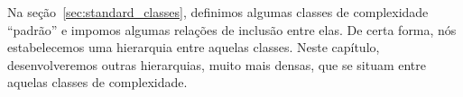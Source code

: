 Na seção~\ref{sec:standard_classes},
definimos algumas classes de complexidade ``padrão''
e impomos algumas relações de inclusão entre elas.
De certa forma, nós estabelecemos uma hierarquia entre aquelas classes.
Neste capítulo,
desenvolveremos outras hierarquias,
muito mais densas,
que se situam entre aquelas classes de complexidade.
